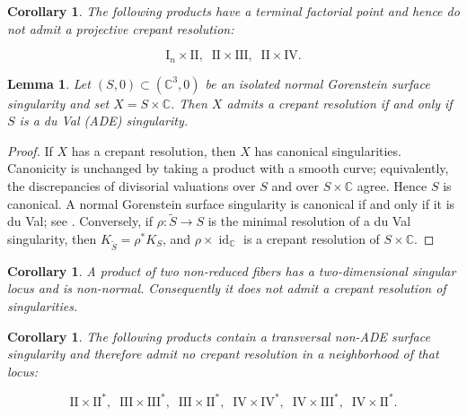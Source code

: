 \documentclass[a4paper]{amsart}
\theoremstyle{plain}
\newtheorem{Lem}[Thm]{Lemma}
\newtheorem{Cor}[Thm]{Corollary}
\theoremstyle{definition}
\theoremstyle{remark}
\numberwithin{equation}{section}
\newcommand{\CC}{\mathbb{C}}
\begin{document}
\begin{Cor}
	The following products have a terminal factorial point and hence do not
	admit a projective crepant resolution:

\[
\mathrm{I}_{n}\times \mathrm{II},\;\;
\mathrm{II}\times \mathrm{III},\;\;
\mathrm{II}\times \mathrm{IV}.
\]
\end{Cor}
\begin{Lem}\label{lem:nonisol}
	Let $(S,0)\subset(\CC^3,0)$ be an isolated normal Gorenstein surface
	singularity and set $X=S\times\CC$.  Then $X$ admits a crepant resolution
	if and only if $S$ is a du Val (ADE) singularity.
\end{Lem}
\begin{proof}
	If $X$ has a crepant resolution, then $X$ has canonical singularities.
	Canonicity is unchanged by taking a product with a smooth curve; equivalently,
	the discrepancies of divisorial valuations over $S$ and over
	$S\times\CC$ agree.  Hence $S$ is canonical.  A normal Gorenstein surface
	singularity is canonical if and only if it is du Val; see
	\cite[Section~4.2]{KollarMori}.  Conversely, if
	$\rho\colon\widetilde S\to S$ is the minimal resolution of a du Val
	singularity, then $K_{\widetilde S}=\rho^*K_S$, and
	$\rho\times\operatorname{id}_{\CC}$ is a crepant resolution of
	$S\times\CC$.
\end{proof}
\begin{Cor}\label{cor:nonnormal}
A product of two non-reduced fibers has a two-dimensional singular locus and
is non-normal.  Consequently it does not admit a crepant resolution of singularities.
\end{Cor}
\begin{Cor}
	The following products contain a transversal non-ADE surface singularity
	and therefore admit no crepant resolution in a neighborhood of that locus:

\[
\mathrm{II}\times \mathrm{II}^{*},\;\; \mathrm{III}\times \mathrm{III}^{*},\;\; \mathrm{III}\times \mathrm{II}^{*},\;\; \mathrm{IV}\times \mathrm{IV}^{*},\;\; \mathrm{IV}\times \mathrm{III}^{*},\;\; \mathrm{IV}\times \mathrm{II}^{*}.
\]
\end{Cor}

\end{document}
